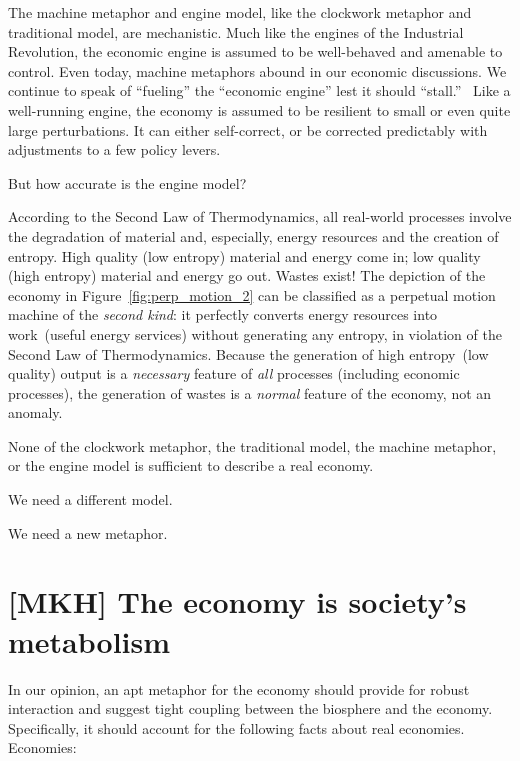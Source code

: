 The machine metaphor and engine model,
like the clockwork metaphor and traditional model,
are mechanistic.
Much like the engines of the Industrial Revolution,
the economic engine is assumed to be well-behaved and amenable to control.
Even today, machine metaphors abound in our economic discussions.
We continue to speak of ``fueling'' the ``economic engine'' 
lest it should ``stall.''~\cite{Liu2012}
Like a well-running engine, the economy is assumed 
to be resilient to small or even quite large perturbations.  
It can either self-correct, 
or be corrected predictably with adjustments to
a few policy levers.

But how accurate is the engine model?

According to the Second Law of Thermodynamics,
all real-world processes involve the degradation
of material and, especially, energy resources
and the creation of entropy.  
High quality (low entropy) material and energy come in;
low quality (high entropy) material and energy go out.
Wastes exist!
The depiction of the economy in Figure~\ref{fig:perp_motion_2} 
can be classified as a perpetual motion machine
of the \emph{second kind}:
it perfectly converts energy resources into 
work~(useful energy services) without generating
any entropy,
in violation of the Second Law of Thermodynamics.
Because the generation of high entropy~(low quality)
output is a \emph{necessary} feature of \emph{all} processes 
(including economic processes),
the generation of wastes is a \emph{normal} feature of
the economy,
not an anomaly.

None of the clockwork metaphor, the traditional model, 
the machine metaphor, or the engine model 
is sufficient to describe a real economy.

We need a different model.

We need a new metaphor.


\section{[MKH] The economy is society's metabolism}
\label{sec:economy_metabolism}

In our opinion, an apt metaphor for the economy should provide for robust interaction
and suggest tight coupling between the biosphere and the economy. 
Specifically, it should account for the following facts about real economies. 
Economies:

